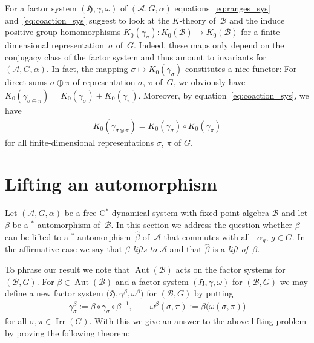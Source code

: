 \documentclass[11pt]{article}
\numberwithin{equation}{section}
\numberwithin{equation}{section}
\newcommand*{\tensor}{\otimes}		%
\DeclareMathOperator{\Aut}{Aut}
\newcommand*{\Star}{$^*$\nobreakdash}
\newcommand*{\hilb}{\mathfrak}		%
\newcommand*{\alg}{\mathcal}		%
\newcommand*{\hH}{\hilb{H}}			%
\newcommand*{\aA}{\alg{A}}			%
\newcommand*{\aB}{\alg{B}} 			%
\DeclareMathOperator{\Irrep}{Irr} 			%
\begin{document}
\begin{Remark}\label{rem:K0_factor_sys}
For a factor system $(\hH, \gamma, \omega)$ of $(\aA,G,\alpha)$ equations~\eqref{eq:ranges_sys} and~\eqref{eq:coaction_sys} suggest to look at the $K$-theory of~$\aB$ and the induce positive group homomorphisms $K_0(\gamma_\sigma)\colon K_0(\aB) \to K_0(\aB)$ for a finite-dimensional representation~$\sigma$ of~$G$.
	Indeed, these maps only depend on the conjugacy class of the factor system and thus amount to invariants for $(\aA, G, \alpha)$.
	In fact, the mapping $\sigma \mapsto K_0(\gamma_\sigma)$ constitutes a nice functor:
	For direct sums $\sigma \oplus \pi$ of representation $\sigma$, $\pi$ of~$G$, we obviously have $K_0(\gamma_{\sigma \oplus \pi}) = K_0(\gamma_\sigma) + K_0(\gamma_\pi)$. Moreover, by equation~\eqref{eq:coaction_sys}, we have
	\begin{gather*}
		K_0(\gamma_{\sigma \tensor \pi}) = K_0(\gamma_\sigma) \circ K_0(\gamma_\pi)
	\end{gather*}
	for all finite-dimensional representations $\sigma$, $\pi$ of $G$.
\end{Remark}

\section{Lifting an automorphism}\label{sec:lift_automorphism}

Let $(\aA, G, \alpha)$ be a free C\Star-dynamical system with fixed point algebra $\aB$ and let $\beta$ be a \Star-auto\-mor\-phism of~$\aB$.
In this section we address the question whether $\beta$ can be lifted to a \Star-automorphism~$\hat \beta$ of~$\aA$ that commutes with all~ $\alpha_g$, $g \in G$.
In the affirmative case we say that \emph{$\beta$ lifts to $\aA$} and that $\hat \beta$ is a \emph{lift of~$\beta$}.

To phrase our result we note that $\Aut(\aB)$ acts on the factor systems for $(\aB,G)$.
For $\beta \in \Aut(\aB)$ and a factor system $(\hH, \gamma, \omega)$ for $(\aB,G)$ we may define a new factor system $\big(\hH, \gamma^\beta, \omega^\beta\big)$ for $(\aB,G)$ by putting
\begin{gather*}
	\gamma^\beta_\sigma
	:= \beta \circ \gamma_\sigma \circ \beta^{-1},
	\qquad
	\omega^\beta(\sigma, \pi)
	:= \beta \bigl( \omega(\sigma, \pi) \bigr)%
\end{gather*}
for all $\sigma, \pi \in \Irrep(G)$.
With this we give an answer to the above lifting problem by proving the following theorem:
\end{document}
